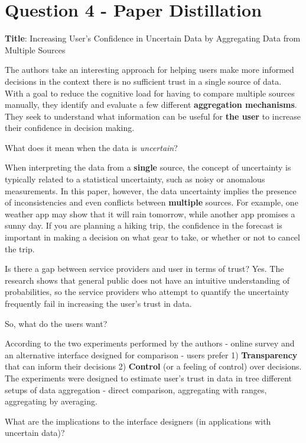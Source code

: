 \documentclass[12pt,letterpaper]{article}
\begin{document}
\section*{Question 4 - Paper Distillation}

\textbf{Title}: Increasing User's Confidence in Uncertain Data by Aggregating Data from Multiple Sources \cite{greis2017increasing}

The authors take an interesting approach for helping users make more informed decisions in the context there is no sufficient trust in a single source of data. With a goal to reduce the cognitive load for having to compare multiple sources manually, they identify and evaluate a few different \textbf{aggregation mechanisms}. They seek to understand what information can be useful for \textbf{the user} to increase their confidence in decision making. 

What does it mean when the data is \textit{uncertain}? 

When interpreting the data from a \textbf{single} source, the concept of uncertainty is typically related to a statistical uncertainty, such as noisy or anomalous measurements. In this paper, however, the data uncertainty implies the presence of inconsistencies and even conflicts between \textbf{multiple} sources. For example, one weather app may show that it will rain tomorrow, while another app promises a sunny day. If you are planning a hiking trip, the confidence in the forecast is important in making a decision on what gear to take, or whether or not to cancel the trip.  

Is there a gap between service providers and user in terms of trust? Yes. The research shows that general public does not have an intuitive understanding of probabilities, so the service providers who attempt to quantify the uncertainty frequently fail in increasing the user's trust in data.

So, what do the users want? 

According to the two experiments performed by the authors - online survey and an alternative interface designed for comparison - users prefer 1) \textbf{Transparency} that can inform their decisions 2) \textbf{Control} (or a feeling of control) over decisions. The experiments were designed to estimate user's trust in data in tree different setups of data aggregation - direct comparison, aggregating with ranges, aggregating by averaging. 

What are the implications to the interface designers (in applications with uncertain data)?
\end{document}
